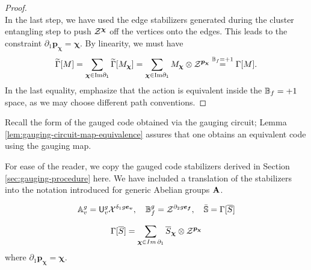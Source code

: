 \documentclass[11pt]{article}
\begin{document}
\begin{proof}
\begin{equation}
    \end{equation}
    In the last step, we have used the edge stabilizers generated during the cluster entangling step to push $\mathcal{Z}^{\bm{\bm{\chi}}}$ off the vertices onto the edges. This leads to the constraint $\partial_1 \bm{p}_{\bm{\bm{\chi}}} = \bm{\bm{\chi}}$. By linearity, we must have 
    \begin{equation}
        \widetilde{\Gamma}[M] = \sum_{\bm{\bm{\chi}} \in \mathrm{Im}\partial_1} \widetilde{\Gamma}[M_{\bm{\bm{\chi}}}] = \sum_{\bm{\bm{\chi}} \in \mathrm{Im}\partial_1} M_{\bm{\bm{\chi}}} \otimes  \mathcal{Z}^{\bm{p}_{\bm{\bm{\chi}}}} \stackrel{\mathbb{B}_f = +1}{=} \Gamma[M].
    \end{equation}
    In the last equality, emphasize that the action is equivalent inside the $\mathbb{B}_f = +1$ space, as we may choose different path conventions.
\end{proof}

Recall the form of the gauged code obtained via the gauging circuit; Lemma \ref{lem:gauging-circuit-map-equivalence} assures that one obtains an equivalent code using the gauging map.
\begin{definition}
\label{def:gauged-code-stabs}
    For ease of the reader, we copy the gauged code stabilizers derived in Section \ref{sec:gauging-procedure} here. We have included a translation of the stabilizers into the notation introduced for generic Abelian groups $\mathbf{A}$.

    \begin{equation}
        \mathbb{A}_v^g = \mathsf{U}_v^g \mathcal{X}^{\delta_1 g \bm{e_v}}, \quad \mathbb{B}_f^g = \mathcal{Z}^{\partial_2 g \bm{e_f}}, \quad \bar{\mathbb{S}}  = \Gamma[\overline{S}] 
    \end{equation}
    
    \begin{equation}
        \Gamma[\overline{S}] = \sum_{\bm{\bm{\chi}} \in \mathop{Im} \partial_1} \overline{S}_{\bm{\bm{\chi}}} \otimes \mathcal{Z}^{\bm{p}_{\bm{\bm{\chi}}}}
    \end{equation}
    where $\partial_1\bm{p}_{\bm{\bm{\chi}}} = \bm{\bm{\chi}}.$
\end{definition}
\end{document}
